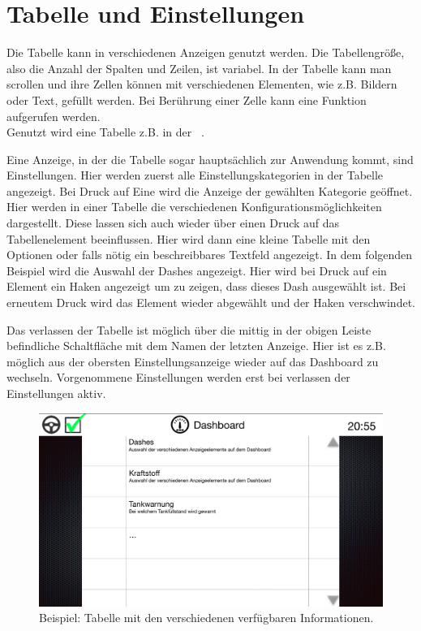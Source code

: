 \documentclass[pflichtenheft.tex]{subfiles}
\begin{document}
\clearpage
\section{Tabelle und Einstellungen}

Die Tabelle kann in verschiedenen Anzeigen genutzt werden. Die Tabellengröße, also die Anzahl der Spalten und Zeilen, ist variabel. In der Tabelle kann man scrollen und ihre Zellen können mit verschiedenen Elementen, wie z.B. Bildern oder Text, gefüllt werden. Bei Berührung einer Zelle kann eine Funktion aufgerufen werden.\\
Genutzt wird eine Tabelle z.B. in der ~. 

Eine Anzeige, in der die Tabelle sogar hauptsächlich zur Anwendung kommt, sind Einstellungen. Hier werden zuerst alle Einstellungskategorien in der Tabelle angezeigt. Bei Druck auf Eine wird die Anzeige der gewählten Kategorie geöffnet. Hier werden in einer Tabelle die verschiedenen Konfigurationsmöglichkeiten dargestellt. Diese lassen sich auch wieder über einen Druck auf das Tabellenelement beeinflussen. Hier wird dann eine kleine Tabelle mit den Optionen oder falls nötig ein beschreibbares Textfeld angezeigt. In dem folgenden Beispiel wird die Auswahl der Dashes angezeigt. Hier wird bei Druck auf ein Element ein Haken angezeigt um zu zeigen, dass dieses Dash ausgewählt ist. Bei erneutem Druck wird das Element wieder abgewählt und der Haken verschwindet.

Das verlassen der Tabelle ist möglich über die mittig in der obigen Leiste befindliche Schaltfläche mit dem Namen der letzten Anzeige. Hier ist es z.B. möglich aus der obersten Einstellungsanzeige wieder auf das Dashboard zu wechseln. Vorgenommene Einstellungen werden erst bei verlassen der Einstellungen aktiv.  

\begin{figure}[H]
  	\begin{center}
 		\includegraphics[width=\textwidth]{Images/GUI-Settings.png}
  		\caption{Beispiel: Tabelle mit den verschiedenen verfügbaren Informationen.}
  	\end{center}
\end{figure}
\end{document}

